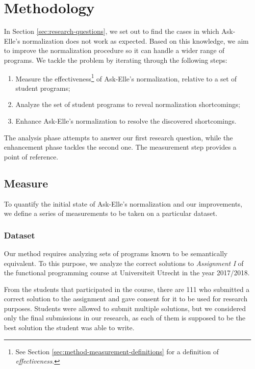\chapter{Methodology}

In Section \ref{sec:research-questions}, we set out to find the cases in which Ask-Elle's normalization does not work as expected. Based on this knowledge, we aim to improve the normalization procedure so it can handle a wider range of programs. We tackle the problem by iterating through the following steps:

\begin{enumerate}
    \item Measure the effectiveness\footnote{See Section \ref{sec:method-measurement-definitions} for a definition of \emph{effectiveness}.} of Ask-Elle's normalization, relative to a set of student programs;
    \item Analyze the set of student programs to reveal normalization shortcomings;
    \item Enhance Ask-Elle's normalization to resolve the discovered shortcomings.
\end{enumerate}

The analysis phase attempts to answer our first research question, while the enhancement phase tackles the second one. The measurement step provides a point of reference.

\section{Measure}
\label{sec:method-measure}

To quantify the initial state of Ask-Elle's normalization and our improvements, we define a series of measurements to be taken on a particular dataset.

\subsection{Dataset}

Our method requires analyzing sets of programs known to be semantically equivalent. To this purpose, we analyze the correct solutions to \emph{Assignment I} of the functional programming course at Universiteit Utrecht in the year 2017/2018.

From the students that participated in the course, there are 111 who submitted a correct solution to the assignment and gave consent for it to be used for research purposes. Students were allowed to submit multiple solutions, but we considered only the final submissions in our research, as each of them is supposed to be the best solution the student was able to write.

